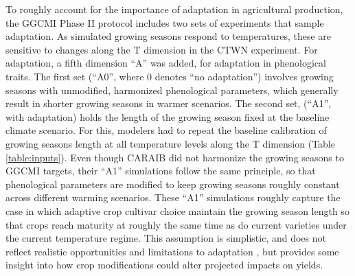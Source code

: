\documentclass[gmd, manuscript]{copernicus} %
\begin{document}
To roughly account for the importance of adaptation in agricultural production, the GGCMI Phase II protocol includes two sets of experiments that sample adaptation. 
As simulated growing seasons respond to temperatures, these are sensitive to changes along the T dimension in the CTWN experiment. For adaptation, a fifth dimension ``A'' was added, for adaptation in phenological traits.
The first set (``A0'', where 0 denotes ``no adaptation'') involves growing seasons with unmodified, harmonized phenological parameters, which generally result in shorter growing seasons in warmer scenarios. 
The second set, (``A1'', with adaptation) holds the length of the growing season fixed at the baseline climate scenario. 
For this, modelers had to repeat the baseline calibration of growing seasons length at all temperature levels along the T dimension (Table \ref{table:inputs}).
Even though CARAIB did not harmonize the growing seasons to GGCMI targets, their ``A1'' simulations follow the same principle, so that phenological parameters are modified to keep growing seasons roughly constant across different warming scenarios.
These ``A1'' simulations roughly capture the case in which adaptive crop cultivar choice maintain the growing season length so that crops reach maturity at roughly the same time as do current varieties under the current temperature regime. 
This assumption is simplistic, and does not reflect realistic opportunities and limitations to adaptation \citep{vadez2012adaptation,challinor2018improving}, but provides some insight into how crop modifications could alter projected impacts on yields.
\end{document}

